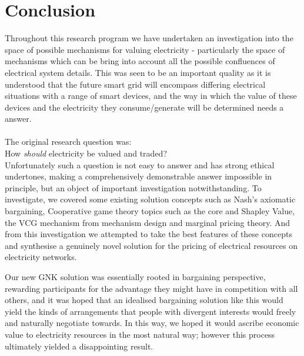 \chapter{Conclusion}
\label{cha:conc}

Throughout this research program we have undertaken an investigation into the space of possible mechanisms for valuing electricity - particularly the space of mechanisms which can be bring into account all the possible confluences of electrical system details.
This was seen to be an important quality as it is understood that the future smart grid will encompass differing electrical situations with a range of smart devices, and the way in which the value of these devices and the electricity they consume/generate will be determined needs a answer.\\
\\\noindent
The original research question was:\\
\-\hspace{1cm}How \textit{should} electricity be valued and traded?\\

Unfortunately such a question is not easy to answer and has strong ethical undertones, making a comprehensively demonstrable answer impossible in principle, but an object of important investigation notwithstanding.
To investigate, we covered some existing solution concepts such as Nash's axiomatic bargaining, Cooperative game theory topics such as the core and Shapley Value, the VCG mechanism from mechanism design and marginal pricing theory.
And from this investigation we attempted to take the best features of these concepts and synthesise a genuinely novel solution for the pricing of electrical resources on electricity networks.

Our new GNK solution was essentially rooted in bargaining perspective, rewarding participants for the advantage they might have in competition with all others, 
and it was hoped that an idealised bargaining solution like this would yield the kinds of arrangements that people with divergent interests would freely and naturally negotiate towards.
In this way, we hoped it would ascribe economic value to electricity resources in the most natural way; however this process ultimately yielded a disappointing result.


